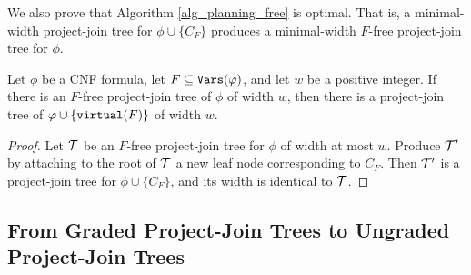 We also prove that Algorithm \ref{alg_planning_free} is optimal. That is, a minimal-width project-join tree for $\phi \cup \{C_F\}$ produces a minimal-width $F$-free project-join tree for $\phi$. 
\begin{theorem}
\label{thm:planning_free_optimal}
Let $\phi$ be a CNF formula, let $F \subseteq \texttt{\upshape Vars}(\varphi)$, and let $w$ be a positive integer. %
If there is an $F$-free project-join tree of $\phi$ of width $w$, then there is a project-join tree of $\varphi \cup \{\texttt{\upshape virtual}(F)\}$ of width $w$.
\end{theorem}
\begin{proof}
Let $\mathcal{T}$ be an $F$-free project-join tree for $\phi$ of width at most $w$. 
Produce $\mathcal{T}'$ by attaching to the root of $\mathcal{T}$ a new leaf node corresponding to $C_F$. 
Then $\mathcal{T}'$ is a project-join tree for $\phi \cup \{C_F\}$, and its width is identical to $\mathcal{T}$.
\end{proof}

\subsection{From Graded Project-Join Trees to Ungraded Project-Join Trees}

